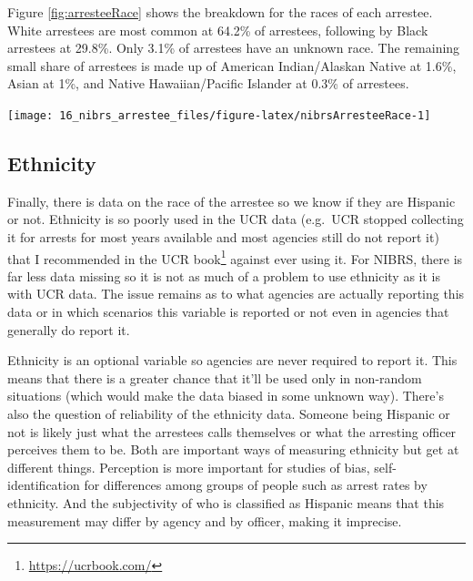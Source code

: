 \documentclass[
]{krantz}
\let\origfigure\figure
\let\endorigfigure\endfigure
\renewenvironment{figure}[1][2] {
    \expandafter\origfigure\expandafter[H]
} {
    \endorigfigure
}
\renewcommand{\href}[2]{#2\footnote{\url{#1}}}
\begin{document}
Figure \ref{fig:arresteeRace} shows the breakdown for the
races of each arrestee. White arrestees are most common at
64.2\% of arrestees, following by Black arrestees at 29.8\%.
Only 3.1\% of arrestees have an unknown race. The remaining
small share of arrestees is made up of American
Indian/Alaskan Native at 1.6\%, Asian at 1\%, and Native
Hawaiian/Pacific Islander at 0.3\% of arrestees.

\begin{figure}

{\centering \texttt{[image: 16\_nibrs\_arrestee\_files/figure-latex/nibrsArresteeRace-1]} 

}

\caption{The share of arrestees by race, 1991-2022.}\label{fig:nibrsArresteeRace}
\end{figure}

\subsection{Ethnicity}\label{ethnicity-4}

Finally, there is data on the race of the arrestee so we
know if they are Hispanic or not. Ethnicity is so poorly
used in the UCR data (e.g.~UCR stopped collecting it for
arrests for most years available and most agencies still do
not report it) that I recommended in the
\href{https://ucrbook.com/}{UCR book} against ever using it.
For NIBRS, there is far less data missing so it is not as
much of a problem to use ethnicity as it is with UCR data.
The issue remains as to what agencies are actually reporting
this data or in which scenarios this variable is reported or
not even in agencies that generally do report it.

Ethnicity is an optional variable so agencies are never
required to report it. This means that there is a greater
chance that it'll be used only in non-random situations
(which would make the data biased in some unknown way).
There's also the question of reliability of the ethnicity
data. Someone being Hispanic or not is likely just what the
arrestees calls themselves or what the arresting officer
perceives them to be. Both are important ways of measuring
ethnicity but get at different things. Perception is more
important for studies of bias, self-identification for
differences among groups of people such as arrest rates by
ethnicity. And the subjectivity of who is classified as
Hispanic means that this measurement may differ by agency
and by officer, making it imprecise.
\end{document}
